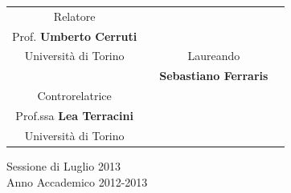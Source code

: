 \documentclass[a4paper,10pt,twoside]{book}
\begin{document}
\begin{titlepage}
\vspace{1cm}
\begin{figure}[!h]
\begin{center}
\end{center}
\end{figure}
\vspace{1cm}



\begin{tabular}{c p{3.3cm}c c}



Relatore & & { } \\
Prof. \textbf{Umberto Cerruti} & & \\
{\small Università di Torino} & & Laureando \\
{  } & &  \textbf{Sebastiano Ferraris}  \\
Controrelatrice & & { } \\
Prof.ssa \textbf{Lea Terracini} & & { }\\
{\small Università di Torino} & & { }\\


\end{tabular}
\vspace{1 cm}

\begin{center}
\large{Sessione di Luglio 2013 \\ Anno Accademico 2012-2013}
\end{center}
\par
\vfill\par 
\clearpage
\endgroup


\end{titlepage}
\end{document}
